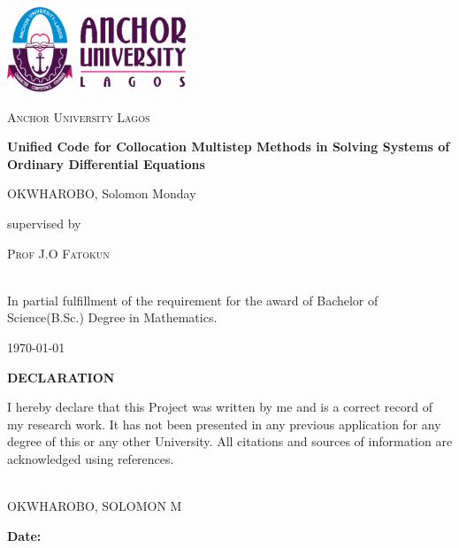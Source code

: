 \documentclass[a4paper, twoside]{report} %
\begin{document}
\fontsize{13}{15}\selectfont
\begin{titlepage}
   \centering
   \vspace*{1cm}
   \includegraphics[width=0.4\textwidth]{aul_logo.png}\par
   \vspace{1.5cm}
   {\scshape\LARGE Anchor University Lagos \par}
   \vspace{1cm}
   \vspace{1.5cm}
   {\huge\bfseries Unified Code for Collocation Multistep Methods in Solving Systems of Ordinary Differential Equations\par}
   \vspace{2cm}
   {\Large OKWHAROBO, Solomon Monday\par}
   \vfill
   supervised by\par
   \textsc{Prof J.O Fatokun}
  
   
    \\
   In partial fulfillment of the requirement for the award of Bachelor of Science(B.Sc.) Degree in Mathematics.
   

   \vfill

   {\large \today\par}
\end{titlepage}


\begin{titlepage}
  \begin{center}
    \textbf{\huge DECLARATION}
\end{center}

\vspace{1cm}

\noindent
I hereby declare that this Project was written by me and is a correct record of my research work. It has not been presented in any previous application for any degree of this or any other University. All citations and sources of information are acknowledged using references.

\vfill

\noindent
\makebox[3in]{\hrulefill} \\
OKWHAROBO, SOLOMON M \\

\vspace{1cm}

\noindent
\textbf{Date:} \makebox[2in]{\hrulefill}
\end{titlepage}
\end{document}
